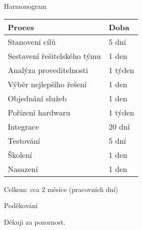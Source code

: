 \documentclass[10pt,xcolor=table]{beamer}
\begin{document}
\begin{frame}{Harmonogram}


	\begin{table}		
		\begin{tabular}{| l | l |}
		\hline
		\cellcolor{tableheader}\color{white} \textbf{Proces} & \cellcolor{tableheader}\color{white} \textbf{Doba} \\
		\hline
		Stanovení cílů & 5 dní \\
		\hline
		Sestavení řešitelského týmu & 1 den \\
		\hline
		Analýza proveditelnosti & 1 týden \\
		\hline
		Výběr nejlepšího řešení & 1 den \\
		\hline
		Objednání služeb & 1 den \\
		\hline
		Pořízení hardwaru & 1 týden \\
		\hline
		Integrace & 20 dní \\
		\hline
		Testování & 5 dní \\
		\hline
		Školení & 1 den \\
		\hline
		Nasazení & 1 den \\		
		\hline
		\end{tabular}		
	\end{table}

	Celkem: cca 2 měsíce (pracovních dní)

\end{frame}

\begin{frame}{Poděkování}
	\begin{block}{Děkuji za pozornost.}
	\end{block}
\end{frame}
\end{document}

